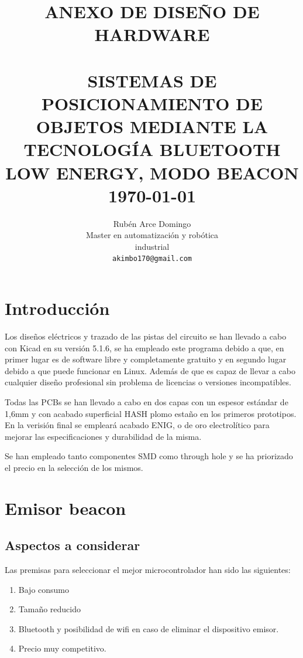 \documentclass[paper=a4, fontsize=11pt,twoside]{scrartcl}	%
\title{	\normalsize \textsc{ANEXO DE DISEÑO DE HARDWARE} 	%
		 	\\[2.0cm]								%
			\HRule{0.5pt} \\						%
			\LARGE \textbf{\uppercase{Sistemas de posicionamiento de objetos mediante la tecnología Bluetooth Low Energy, modo Beacon}}	%
			\HRule{2pt} \\ [0.5cm]		%
			\normalsize \today			%
		}
\author{
		Rubén Arce Domingo\\	
		Master en automatización y robótica\\	
		industrial\\
        \texttt{akimbo170@gmail.com} \\
}
\makeatletter
\def\printtitle{%
    {\centering \@title\par}}
\def\printauthor{%
    {\centering \large \@author}}
\makeatother
\begin{document}
\thispagestyle{empty}		%
\printtitle					%
  	\vfill
\printauthor				%
\newpage


\cleardoublepage
\tableofcontents
\listoffigures
\cleardoublepage
\pagestyle{fancy}

\section{Introducción}
    Los diseños eléctricos y trazado de las pistas del circuito se han llevado a cabo con Kicad en 
    su versión 5.1.6, se ha empleado este programa debido a que, en primer lugar es de software libre y
    completamente gratuito y en segundo lugar debido a que puede funcionar en Linux. Además de que es capaz de llevar a cabo 
    cualquier diseño profesional sin problema de licencias o versiones incompatibles.

    Todas las PCBs se han llevado a cabo en dos capas con un espesor estándar de 1,6mm y con acabado superficial
    HASH plomo estaño en los primeros prototipos. En la verisión final se empleará acabado ENIG, o de oro 
    electrolítico para mejorar las especificaciones y durabilidad de la misma.

    Se han empleado tanto componentes SMD como through hole y se ha priorizado el precio en la selección de los mismos.
\section{Emisor beacon}
    \subsection{Aspectos a considerar}
        Las premisas para seleccionar el mejor microcontrolador han sido las siguientes: 
        \begin{enumerate}
            \item Bajo consumo
            \item Tamaño reducido
            \item Bluetooth y posibilidad de wifi en caso de eliminar el dispositivo emisor.
            \item Precio muy competitivo.
        \end{enumerate}
\end{document}
